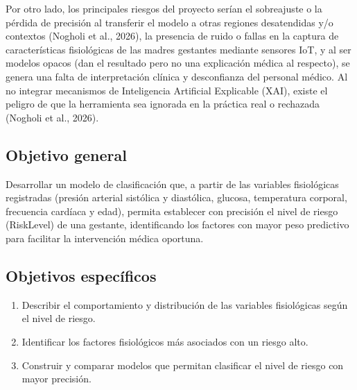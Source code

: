 Por otro lado, los principales riesgos del proyecto serían el sobreajuste o la
pérdida de precisión al transferir el modelo a otras regiones desatendidas y/o
contextos (Nogholi et al., 2026), la presencia de ruido o fallas en la captura
de características fisiológicas de las madres gestantes mediante sensores IoT, y
al ser modelos opacos (dan el resultado pero no una explicación médica al
respecto), se genera una falta de interpretación clínica y desconfianza del
personal médico. Al no integrar mecanismos de Inteligencia Artificial Explicable
(XAI), existe el peligro de que la herramienta sea ignorada en la práctica real
o rechazada (Nogholi et al., 2026).

\subsection{Objetivo general}

Desarrollar un modelo de clasificación que, a partir de las variables
fisiológicas registradas (presión arterial sistólica y diastólica, glucosa,
temperatura corporal, frecuencia cardíaca y edad), permita establecer con
precisión el nivel de riesgo (RiskLevel) de una gestante, identificando los
factores con mayor peso predictivo para facilitar la intervención médica
oportuna.

\subsection{Objetivos específicos}

\begin{enumerate}
  \item Describir el comportamiento y distribución de las variables fisiológicas
        según el nivel de riesgo.
  \item Identificar los factores fisiológicos más asociados con un riesgo alto.
  \item Construir y comparar modelos que permitan clasificar el nivel de riesgo
        con mayor precisión.
\end{enumerate}


